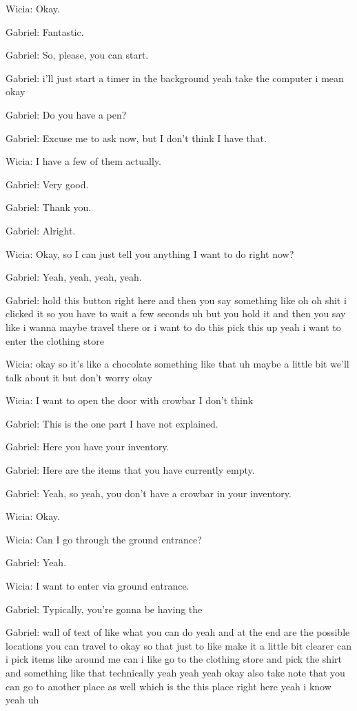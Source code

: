 Wicia: Okay.

Gabriel: Fantastic.

Gabriel: So, please, you can start.

Gabriel: i'll just start a timer in the background yeah take the computer i mean okay

Gabriel: Do you have a pen?

Gabriel: Excuse me to ask now, but I don't think I have that.

Wicia: I have a few of them actually.

Gabriel: Very good.

Gabriel: Thank you.

Gabriel: Alright.

Wicia: Okay, so I can just tell you anything I want to do right now?

Gabriel: Yeah, yeah, yeah, yeah.

Gabriel: hold this button right here and then you say something like oh oh shit i clicked it so you have to wait a few seconds uh but you hold it and then you say like i wanna maybe travel there or i want to do this pick this up yeah i want to enter the clothing store

Wicia: okay so it's like a chocolate something like that uh maybe a little bit we'll talk about it but don't worry okay

Wicia: I want to open the door with crowbar I don't think

Gabriel: This is the one part I have not explained.

Gabriel: Here you have your inventory.

Gabriel: Here are the items that you have currently empty.

Gabriel: Yeah, so yeah, you don't have a crowbar in your inventory.

Wicia: Okay.

Wicia: Can I go through the ground entrance?

Gabriel: Yeah.

Wicia: I want to enter via ground entrance.

Gabriel: Typically, you're gonna be having the

Gabriel: wall of text of like what you can do yeah and at the end are the possible locations you can travel to okay so that just to like make it a little bit clearer can i pick items like around me can i like go to the clothing store and pick the shirt and something like that technically yeah yeah yeah okay also take note that you can go to another place as well which is the this place right here yeah i know yeah uh


